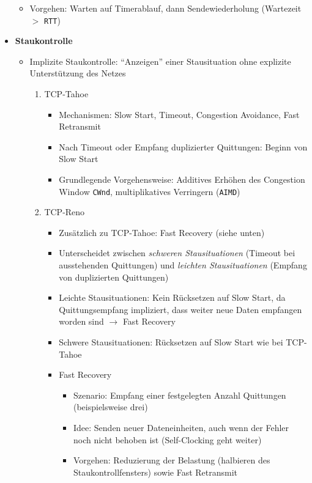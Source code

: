 \begin{itemize}
\begin{itemize}
		\item Vorgehen: Warten auf Timerablauf, dann Sendewiederholung (Wartezeit \(>\) \texttt{RTT})
	\end{itemize}
	\item \textbf{Staukontrolle}
	\begin{itemize}
		\item Implizite Staukontrolle: "`Anzeigen"' einer Stausituation ohne explizite Unterstützung des Netzes
		\begin{enumerate}
			\item TCP-Tahoe
			\begin{itemize}
				\item Mechanismen: Slow Start, Timeout, Congestion Avoidance, Fast Retransmit
				\item Nach Timeout oder Empfang duplizierter Quittungen: Beginn von Slow Start
				\item Grundlegende Vorgehensweise: Additives Erhöhen des Congestion Window \texttt{CWnd}, multiplikatives Verringern (\texttt{AIMD})
			\end{itemize}
			\item TCP-Reno
			\begin{itemize}
				\item Zusätzlich zu TCP-Tahoe: Fast Recovery (siehe unten)
				\item Unterscheidet zwischen \textit{schweren Stausituationen} (Timeout bei ausstehenden Quittungen) und \textit{leichten Stausituationen} (Empfang von duplizierten Quittungen)
				\item Leichte Stausituationen: Kein Rücksetzen auf Slow Start, da Quittungsempfang impliziert, dass weiter neue Daten empfangen worden sind \(\rightarrow\) Fast Recovery
				\item Schwere Stausituationen: Rücksetzen auf Slow Start wie bei TCP-Tahoe
				\item Fast Recovery
				\begin{itemize}
					\item Szenario: Empfang einer festgelegten Anzahl Quittungen (beispielsweise drei)
					\item Idee: Senden neuer Dateneinheiten, auch wenn der Fehler noch nicht behoben ist (Self-Clocking geht weiter)
					\item Vorgehen: Reduzierung der Belastung (halbieren des Staukontrollfensters) sowie Fast Retransmit
				\end{itemize}
			\end{itemize}
		\end{enumerate}

\end{itemize}
\end{itemize}

